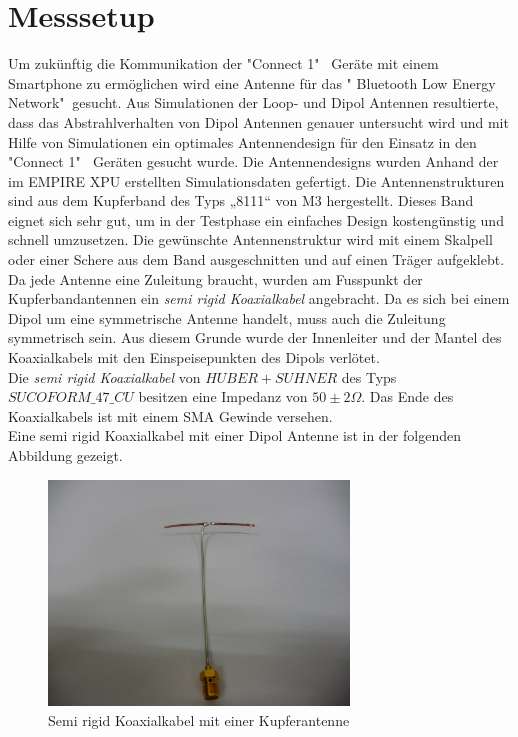 \section{Messsetup}
Um zukünftig die Kommunikation der "Connect 1" \   Geräte mit einem Smartphone zu ermöglichen wird eine Antenne für das " Bluetooth Low Energy Network"$\ $ gesucht. Aus Simulationen der Loop- und Dipol Antennen resultierte, dass das Abstrahlverhalten von Dipol Antennen genauer untersucht wird und mit Hilfe von Simulationen ein optimales Antennendesign für den Einsatz in den "Connect 1" $\ $ Geräten gesucht wurde. 
Die Antennendesigns wurden Anhand der im EMPIRE XPU erstellten Simulationsdaten gefertigt. Die Antennenstrukturen sind aus dem Kupferband des Typs „8111“ von M3 hergestellt. Dieses Band eignet sich sehr gut, um in der Testphase ein einfaches Design kostengünstig und schnell umzusetzen. Die gewünschte Antennenstruktur wird mit einem Skalpell oder einer Schere aus dem Band ausgeschnitten und auf einen Träger aufgeklebt. \\
Da jede Antenne eine Zuleitung braucht, wurden am Fusspunkt der Kupferbandantennen ein \textit{semi rigid Koaxialkabel} angebracht. Da es sich bei einem Dipol um eine symmetrische Antenne handelt, muss auch die Zuleitung symmetrisch sein. Aus diesem Grunde wurde der Innenleiter und der Mantel des Koaxialkabels mit den Einspeisepunkten des Dipols verlötet.\\
Die \textit{semi rigid Koaxialkabel} von $HUBER+SUHNER$ des Typs $SUCOFORM\_47\_CU$ besitzen eine Impedanz von $50  \pm 2\Omega$. Das Ende des Koaxialkabels ist mit einem SMA Gewinde versehen.\\

Eine semi rigid Koaxialkabel mit einer Dipol Antenne ist in der folgenden Abbildung gezeigt.
\begin{figure}[!h]
	\centering
	\includegraphics[width=8cm]{content/bilder/Implementierung/KoaxMitAntenne.JPG}%
	\caption{Semi rigid Koaxialkabel mit einer Kupferantenne}
	\label{fig:KoaxMitAntenne}
\end{figure}



